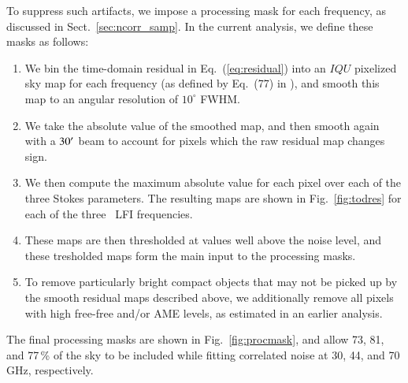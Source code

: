 \documentclass[twocolumn]{aa}
\begin{document}
To suppress such artifacts, we impose a processing mask for each
frequency, as discussed in Sect.~\ref{sec:ncorr_samp}. In the current
analysis, we define these masks as follows:
\begin{enumerate}
\item We bin the time-domain residual in Eq.~(\ref{eq:residual}) into
  an $IQU$ pixelized sky map for each frequency (as defined by Eq.~(77) in
  \citealp{bp01}), and smooth this map to an angular resolution of
  $10^{\circ}$ FWHM.
\item We take the absolute value of the smoothed map, and then smooth
  again with a $30\arcm$ beam to account for pixels which the raw
  residual map changes sign.
\item We then compute the maximum absolute value for each pixel over
  each of the three Stokes parameters. The resulting maps are shown in
  Fig.~\ref{fig:todres} for each of the three \Planck\ LFI frequencies.
\item These maps are then thresholded at values well above the
  noise level, and these tresholded maps form the main input to the
  processing masks. 
\item To remove particularly bright compact objects that may not be
  picked up by the smooth residual maps described above, we
  additionally remove all pixels with high free-free and/or AME
  levels, as estimated in an earlier analysis.
\end{enumerate}
The final processing masks are shown in Fig.~\ref{fig:procmask}, and
allow 73, 81, and 77\,\% of the sky to be included while fitting
correlated noise at 30, 44, and 70\,GHz, respectively.
\end{document}

